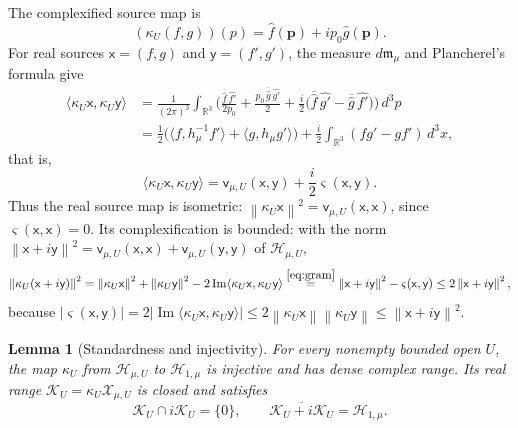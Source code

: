 \documentclass[11pt]{amsart}
\numberwithin{equation}{section}
\newtheorem{lemma}[theorem]{Lemma}
\theoremstyle{definition}
\newcommand{\R}{\mathbb R}
\newcommand{\Hh}{\mathcal H}
\newcommand{\vv}{\mathsf v}
\newcommand{\sx}{\mathsf x}
\newcommand{\sy}{\mathsf y}
\newcommand{\bp}{\mathbf p}
\newcommand{\Ima}{\operatorname{Im}}
\newcommand{\norm}[1]{\left\|#1\right\|}
\newcommand{\ip}[2]{\langle #1,#2\rangle}
\newcommand{\wh}[1]{\widehat{#1}}
\begin{document}
The complexified source map is
\[
 (\kappa_U(f,g))(p)=\wh f(\bp)+ip_0\wh g(\bp).
\]
For real sources \(\sx=(f,g)\) and \(\sy=(f',g')\), the measure
\(d\mathfrak m_\mu\) and Plancherel's formula give
\begin{align*}
 \ip{\kappa_U\sx}{\kappa_U\sy}
 &=\frac1{(2\pi)^3}\int_{\R^3}\biggl(
   \frac{\overline{\wh f}\,\wh{f'}}{2p_0}
   +\frac{p_0\,\overline{\wh g}\,\wh{g'}}2
   +\frac i2\bigl(\overline{\wh f}\,\wh{g'}-\overline{\wh g}\,\wh{f'}\bigr)
   \biggr)\,d^3p\\
 &=\frac12\bigl(\ip{f}{h_\mu^{-1}f'}+\ip{g}{h_\mu g'}\bigr)
   +\frac i2\int_{\R^3}(fg'-gf')\,d^3x,
\end{align*}
that is,
\begin{equation}
 \ip{\kappa_U\sx}{\kappa_U\sy}
 =\vv_{\mu,U}(\sx,\sy)+\frac i2\varsigma(\sx,\sy).
 \label{eq:gram}
\end{equation}
Thus the real source map is isometric:
\(\norm{\kappa_U\sx}^2=\vv_{\mu,U}(\sx,\sx)\), since
\(\varsigma(\sx,\sx)=0\). Its complexification is bounded: with the norm
\(\norm{\sx+i\sy}^2=\vv_{\mu,U}(\sx,\sx)+\vv_{\mu,U}(\sy,\sy)\) of
\(\Hh_{\mu,U}\),
\[
 \norm{\kappa_U(\sx+i\sy)}^2
 =\norm{\kappa_U\sx}^2+\norm{\kappa_U\sy}^2
  -2\Ima\ip{\kappa_U\sx}{\kappa_U\sy}
 \overset{\eqref{eq:gram}}{=}\norm{\sx+i\sy}^2-\varsigma(\sx,\sy)
 \le2\norm{\sx+i\sy}^2,
\]
because
\(|\varsigma(\sx,\sy)|=2\lvert\Ima\ip{\kappa_U\sx}{\kappa_U\sy}\rvert
\le2\norm{\kappa_U\sx}\norm{\kappa_U\sy}\le\norm{\sx+i\sy}^2\).

\begin{lemma}[Standardness and injectivity]\label{lem:standard}
For every nonempty bounded open \(U\), the map \(\kappa_U\) from
\(\Hh_{\mu,U}\) to \(\Hh_{1,\mu}\) is injective and has dense complex range. Its real range
\(\mathcal K_U=\kappa_U\mathcal X_{\mu,U}\) is closed and satisfies
\begin{equation}
 \mathcal K_U\cap i\mathcal K_U=\{0\},\qquad
 \overline{\mathcal K_U+i\mathcal K_U}=\Hh_{1,\mu}.
 \label{eq:standard}
\end{equation}
\end{lemma}
\end{document}
